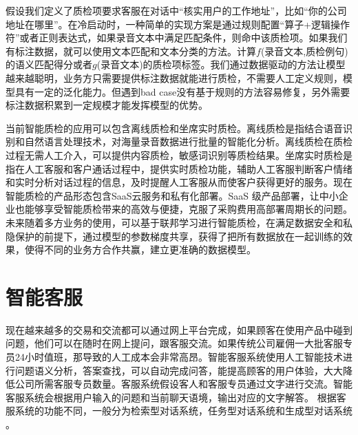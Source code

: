 \documentclass[graybox,envcountchap,sectrefs]{svmono}
\begin{document}
假设我们定义了质检项要求客服在对话中“核实用户的工作地址”，比如“你的公司地址在哪里”。在冷启动时，一种简单的实现方案是通过规则配置“算子+逻辑操作符”或者正则表达式，如果录音文本中满足匹配条件，则命中该质检项。如果我们有标注数据，就可以使用文本匹配和文本分类的方法。计算$f$(录音文本,质检例句)的语义匹配得分或者$g$(录音文本)的质检项标签。我们通过数据驱动的方法让模型越来越聪明，业务方只需要提供标注数据就能进行质检，不需要人工定义规则，模型具有一定的泛化能力。但遇到bad case没有基于规则的方法容易修复，另外需要标注数据积累到一定规模才能发挥模型的优势。

当前智能质检的应用可以包含离线质检和坐席实时质检。离线质检是指结合语音识别和自然语言处理技术，对海量录音数据进行批量的智能化分析。离线质检在质检过程无需人工介入，可以提供内容质检，敏感词识别等质检结果。坐席实时质检是指在人工客服和客户通话过程中，提供实时质检功能，辅助人工客服判断客户情绪和实时分析对话过程的信息，及时提醒人工客服从而使客户获得更好的服务。现在智能质检的产品形态包含SaaS云服务和私有化部署。SaaS 级产品部署，让中小企业也能够享受智能质检带来的高效与便捷，克服了采购费用高部署周期长的问题。未来随着多方业务的使用，可以基于联邦学习进行智能质检，在满足数据安全和私隐保护的前提下，通过模型的参数梯度共享，获得了把所有数据放在一起训练的效果，使得不同的业务方合作共赢，建立更准确的数据模型。


\section{智能客服}
现在越来越多的交易和交流都可以通过网上平台完成，如果顾客在使用产品中碰到问题，他们可以在随时在网上提问，跟客服交流。如果传统公司雇佣一大批客服专员24小时值班，那导致的人工成本会非常高昂。智能客服系统使用人工智能技术进行问题语义分析，答案查找，可以自动完成问答，能提高顾客的用户体验，大大降低公司所需客服专员数量。客服系统假设客人和客服专员通过文字进行交流。智能客服系统会根据用户输入的问题和当前聊天语境，输出对应的文字解答。
根据客服系统的功能不同，一般分为检索型对话系统，任务型对话系统\cite{young2013pomdp}和生成型对话系统
\cite{sutskever2014sequence,shang2015neural,serban2016building,serban2016hierarchical}。
\end{document}
